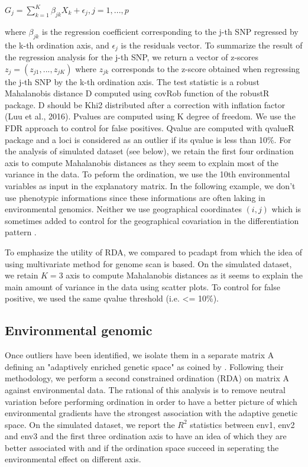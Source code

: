\documentclass[nogrid]{MBE}%
\begin{document}
$G_j = \sum^{K}_{k=1}\beta_{jk}X_{k}+\epsilon_{j}, j=1,...,p$

where $\beta_{jk}$ is the regression coefficient corresponding to the j-th SNP regressed by the k-th ordination axis, and $\epsilon_{j}$ is the residuals vector. To summarize the result of the regression analysis for the j-th SNP, we return a vector of z-scores $z_{j} = (z_{j1}, ..., z_{jK})$ where $z_{jk}$ corresponds to the z-score obtained when regressing the j-th SNP by the k-th ordination axis.
The test statistic is a robust Mahalanobis distance D computed using covRob function of the robustR package. D should be Khi2 distributed after a correction with inflation factor (Luu et al., 2016). Pvalues are computed using K degree of freedom. We use the FDR approach to control for false positives. Qvalue are computed with qvalueR package and a loci is considered as an outlier if its qvalue is less than 10\%.
For the analysis of simulated dataset (see below), we retain the first four ordination axis to compute Mahalanobis distances  as they seem to explain most of the variance in the data. To peform the ordination, we use the 10th environmental variables as input in the explanatory matrix. In the following example, we don't use phenotypic informations since these informations are often laking in environmental genomics. Neither we use geographical coordinates $(i,j)$ which is sometimes added to control for the geographical covariation in the differentiation pattern \citep{Frichot2013}.

To emphasize the utility of RDA, we compared to pcadapt from which the idea of using multivariate method for genome scan is based. On the simulated dataset, we retain $K=3$ axis to compute Mahalanobis distances  as it seems to explain the main amount of variance in the data using scatter plots. To control for false positive, we used the same qvalue threshold (i.e. <= 10\%).


\subsection{Environmental genomic}

Once outliers have been identified, we isolate them in a separate matrix A defining an "adaptively enriched genetic space" as coined by \citet{Steane2014a}. Following their methodology, we perform a second constrained ordination (RDA) on matrix A against environmental data. The rational of this analysis is to remove neutral variation before performing ordination in order to have a better picture of which environmental gradients have the strongest association with the adaptive genetic space. On the simulated dataset, we report the $R^2$ statistics between env1, env2 and env3 and the first three ordination axis to have an idea of which they are better associated with and if the ordination space succeed in seperating the environmental effect on different axis.
\end{document}
